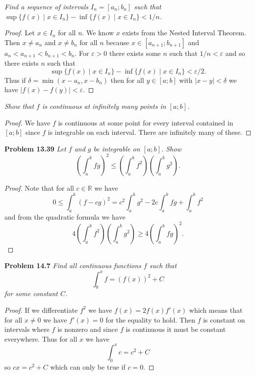 \documentclass{article}
\begin{document}
\begin{flushleft}
\textsl{Find a sequence of intervals $I_n = [a_n;b_n]$ such that $\sup \{f(x) \mid x \in I_n\} - \inf \{f(x) \mid x \in I_n\} < 1/n$.}
\begin{proof}
Let $x \in I_n$ for all $n$. We know $x$ exists from the Nested Interval Theorem. Then $x \neq a_n$ and $x \neq b_n$ for all $n$ because $x \in [a_{n+1};b_{n+1}]$ and $a_n < a_{n+1} < b_{n+1} < b_n$. For $\varepsilon > 0$ there exists some $n$ such that $1/n < \varepsilon$ and so there exists $n$ such that
\[
\sup \{f(x) \mid x \in I_n\} - \inf \{f(x) \mid x \in I_n\} < \varepsilon/2.
\]
Thus if $\delta = \min (x-a_n, x-b_n)$ then for all $y \in [a;b]$ with $|x-y| < \delta$ we have $|f(x)-f(y)| < \varepsilon$.
\end{proof}

\textsl{Show that $f$ is continuous at infinitely many points in $[a;b]$.}
\begin{proof}
We have $f$ is continuous at some point for every interval contained in $[a;b]$ since $f$ is integrable on each interval. There are infinitely many of these.
\end{proof}

\textbf{Problem 13.39}
\textsl{Let $f$ and $g$ be integrable on $[a;b]$. Show
\[
\left ( \int_a^b fg \right )^2 \leq \left ( \int_a^b f^2 \right ) \left ( \int_a^b g^2 \right ).
\]}
\begin{proof}
Note that for all $c \in \mathbb{R}$ we have
\[
0 \leq \int_a^b (f - cg)^2 = c^2 \int_a^b g^2 - 2c \int_a^b fg + \int_a^b f^2
\]
and from the quadratic formula we have
\[
4 \left ( \int_a^b f^2 \right ) \left ( \int_a^b g^2 \right ) \geq 4 \left ( \int_a^b fg \right )^2.
\]
\end{proof}

\textbf{Problem 14.7}
\textsl{Find all continuous functions $f$ such that
\[
\int_0^x f = (f(x))^2 + C
\]
for some constant $C$.}
\begin{proof}
If we differentiate $f^2$ we have $f(x) = 2f(x)f'(x)$ which means that for all $x \neq 0$ we have $f'(x) = 0$ for the equality to hold. Then $f$ is constant on intervals where $f$ is nonzero and since $f$ is continuous it must be constant everywhere. Thus for all $x$ we have
\[
\int_0^x c = c^2 + C
\]
so $cx = c^2 + C$ which can only be true if $c=0$.
\end{proof}

\end{flushleft}
\end{document}
